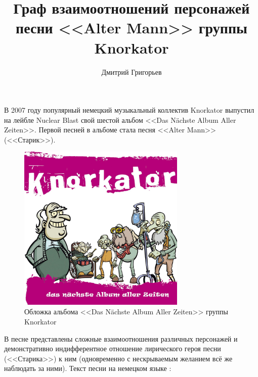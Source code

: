 \documentclass[a4paper,12pt,notitlepage]{article}
\author{Дмитрий Григорьев}
\title{Граф взаимоотношений персонажей\\песни <<Alter Mann>> группы Knorkator}
\begin{document}
  \maketitle

  В 2007 году популярный немецкий музыкальный коллектив Knorkator выпустил на лейбле Nuclear Blast свой шестой альбом <<Das Nächste Album Aller Zeiten>>. Первой песней в альбоме стала песня <<Alter Mann>> (<<Старик>>).
	
	\begin{figure}[ht]
    \centering
    \includegraphics[width=8cm]{coverart.jpg}
    \caption{Обложка альбома <<Das Nächste Album Aller Zeiten>> группы Knorkator}
    \label{fig:graph}
  \end{figure}

  В песне представлены сложные взаимоотношения различных персонажей и демонстративно индифферентное отношение лирического героя песни (<<Старика>>) к ним (одновременно с нескрываемым желанием всё же наблюдать за ними). Текст песни на немецком языке \cite{knorkator01}:
  
	\newpage

  
  \settowidth{\versewidth}{Doch Pech denn er ist schon länger}
\end{document}
